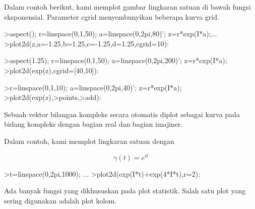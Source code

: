 \documentclass{article}
\begin{document}
\begin{eulernotebook}
\begin{eulercomment}
\begin{eulercomment}
\begin{eulercomment}
\begin{eulercomment}
\begin{eulercomment}
\begin{eulercomment}
\begin{eulercomment}
\begin{eulercomment}
\begin{eulercomment}
\begin{eulercomment}
\begin{eulercomment}
\begin{eulercomment}
\begin{eulercomment}
\begin{eulercomment}
\begin{eulercomment}
\begin{eulercomment}
\begin{eulercomment}
\begin{eulercomment}
\begin{eulercomment}
\begin{eulercomment}
\begin{eulercomment}
\begin{eulercomment}
\begin{eulercomment}
\begin{eulercomment}
\begin{eulercomment}
\begin{eulercomment}
\begin{eulercomment}
Dalam contoh berikut, kami memplot gambar lingkaran satuan di bawah
fungsi eksponensial. Parameter cgrid menyembunyikan beberapa kurva
grid.
\end{eulercomment}
\begin{eulerprompt}
>aspect(); r=linspace(0,1,50); a=linspace(0,2pi,80)'; z=r*exp(I*a);...
>plot2d(z,a=-1.25,b=1.25,c=-1.25,d=1.25,cgrid=10):
\end{eulerprompt}
\begin{eulerprompt}
>aspect(1.25); r=linspace(0,1,50); a=linspace(0,2pi,200)'; z=r*exp(I*a);
>plot2d(exp(z),cgrid=[40,10]):
\end{eulerprompt}
\begin{eulerprompt}
>r=linspace(0,1,10); a=linspace(0,2pi,40)'; z=r*exp(I*a);
>plot2d(exp(z),>points,>add):
\end{eulerprompt}
\begin{eulercomment}
Sebuah vektor bilangan kompleks secara otomatis diplot sebagai kurva
pada bidang kompleks dengan bagian real dan bagian imajiner.

Dalam contoh, kami memplot lingkaran satuan dengan

\end{eulercomment}
\begin{eulerformula}
\[
\gamma(t) = e^{it}
\]
\end{eulerformula}
\begin{eulerprompt}
>t=linspace(0,2pi,1000); ...
>plot2d(exp(I*t)+exp(4*I*t),r=2):
\end{eulerprompt}
\begin{eulercomment}
Ada banyak fungsi yang dikhususkan pada plot statistik. Salah satu
plot yang sering digunakan adalah plot kolom.


\end{eulercomment}
\end{eulercomment}
\end{eulercomment}
\end{eulercomment}
\end{eulercomment}
\end{eulercomment}
\end{eulercomment}
\end{eulercomment}
\end{eulercomment}
\end{eulercomment}
\end{eulercomment}
\end{eulercomment}
\end{eulercomment}
\end{eulercomment}
\end{eulercomment}
\end{eulercomment}
\end{eulercomment}
\end{eulercomment}
\end{eulercomment}
\end{eulercomment}
\end{eulercomment}
\end{eulercomment}
\end{eulercomment}
\end{eulercomment}
\end{eulercomment}
\end{eulercomment}
\end{eulercomment}
\end{eulernotebook}
\end{document}
